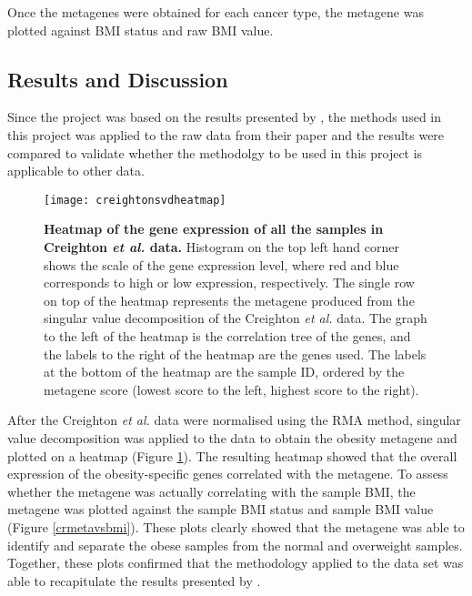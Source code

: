 \documentclass[12pt, a4paper]{article}
\begin{document}
\begin{description}[leftmargin=0pt]
\item[Assessing whether the metagene is associated with BMI.]

Once the metagenes were obtained for each cancer type, the metagene was plotted against BMI status and raw BMI value.

\end{description}



\vspace{-30pt}

\subsection*{Results and Discussion}

Since the project was based on the results presented by \citet{Creighton2012}, the methods used in this project was applied to the raw data from their paper and the results were compared to validate whether the methodolgy to be used in this project is applicable to other data.

\begin{figure}[h!]
\centering
\texttt{[image: creightonsvdheatmap]}
\caption{\textbf{Heatmap of the gene expression of all the samples in Creighton \textit{et al.} data.}
Histogram on the top left hand corner shows the scale of the gene expression level, where red  and blue corresponds to high or low expression, respectively.
The single row on top of the heatmap represents the metagene produced from the singular value decomposition of the Creighton \textit{et al.} data.
The graph to the left of the heatmap is the correlation tree of the genes, and the labels to the right of the heatmap are the genes used.
The labels at the bottom of the heatmap are the sample ID, ordered by the metagene score (lowest score to the left, highest score to the right).}
\label{crheatmap}
\end{figure}

After the Creighton \textit{et al.} data were normalised using the RMA method, singular value decomposition was applied to the data to obtain the obesity metagene and plotted on a heatmap (Figure \ref{crheatmap}).
The resulting heatmap showed that the overall expression of the obesity-specific genes correlated with the metagene.
To assess whether the metagene was actually correlating with the sample BMI, the metagene was plotted against the sample BMI status and sample BMI value (Figure \ref{crmetavsbmi}).
These plots clearly showed that the metagene was able to identify and separate the obese samples from the normal and overweight samples.
Together, these plots confirmed that the methodology applied to the data set was able to recapitulate the results presented by \citet{Creighton2012}.
\end{document}
